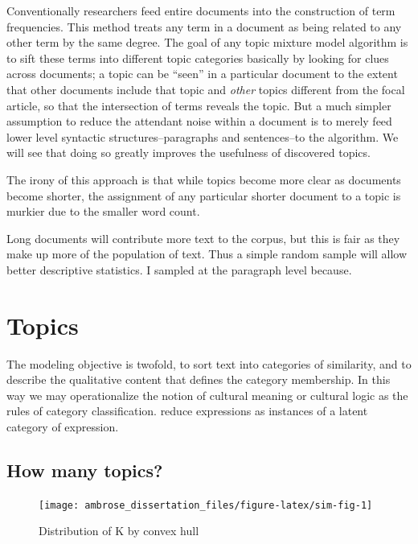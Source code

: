 \documentclass[]{book}
\theoremstyle{definition}
\theoremstyle{definition}
\theoremstyle{definition}
\theoremstyle{remark}
\begin{document}
Conventionally researchers feed entire documents into the construction
of term frequencies. This method treats any term in a document as being
related to any other term by the same degree. The goal of any topic
mixture model algorithm is to sift these terms into different topic
categories basically by looking for clues across documents; a topic can
be ``seen'' in a particular document to the extent that other documents
include that topic and \emph{other} topics different from the focal
article, so that the intersection of terms reveals the topic. But a much
simpler assumption to reduce the attendant noise within a document is to
merely feed lower level syntactic structures--paragraphs and
sentences--to the algorithm. We will see that doing so greatly improves
the usefulness of discovered topics.

The irony of this approach is that while topics become more clear as
documents become shorter, the assignment of any particular shorter
document to a topic is murkier due to the smaller word count.

Long documents will contribute more text to the corpus, but this is fair
as they make up more of the population of text. Thus a simple random
sample will allow better descriptive statistics. I sampled at the
paragraph level because.

\hypertarget{kd-dp2}{%
\section{Topics}\label{kd-dp2}}

The modeling objective is twofold, to sort text into categories of
similarity, and to describe the qualitative content that defines the
category membership. In this way we may operationalize the notion of
cultural meaning or cultural logic as the rules of category
classification. reduce expressions as instances of a latent category of
expression.

\hypertarget{how-many-topics}{%
\subsection{How many topics?}\label{how-many-topics}}

\begin{figure}

{\centering \texttt{[image: ambrose\_dissertation\_files/figure-latex/sim-fig-1]} 

}

\caption{Distribution of K by convex hull}\label{fig:sim-fig}
\end{figure}
\end{document}
